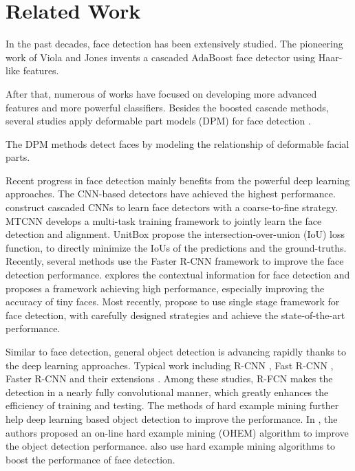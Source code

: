 \documentclass{article} \usepackage{nips13submit_e,times}
\newcommand{\ignore}[1]{}
\begin{document}
\section{Related Work}



In the past decades, face detection has been extensively studied.
The pioneering work of Viola and Jones \cite{vj} 
invents a cascaded AdaBoost face detector using Haar-like features.
\ignore{proposed to learn the cascaded AdaBoost classifier based on Haar-like features for face detection.}
After that, numerous of works \cite{vj1,vj2,vj3} have focused on developing more advanced features and more powerful classifiers. 
Besides the boosted cascade methods, several studies apply deformable
part models (DPM) for face detection \cite{dpmface2,dpmface3,dpmface}. 
\ignore{Besides the cascade based face detection methods, \cite{dpmface2,dpmface3,dpmface} use the deformable
part models (DPM) for face detection.} 
The DPM methods detect faces by modeling the relationship of deformable facial parts.
\ignore{define a face
with a collection of deformable parts and train a classifier to find these parts and their relationship.}

Recent progress in face detection mainly benefits from the powerful 
deep learning approaches. The CNN-based detectors have achieved the highest
performance. \cite{cascadeCNN,cascadeCNN2,spl} construct cascaded CNNs to learn face detectors with a coarse-to-fine
strategy.  MTCNN \cite{spl} develops a multi-task training framework to jointly learn the face detection and alignment.
UnitBox \cite{unitbox} propose the intersection-over-union (IoU) loss function, to directly minimize the
IoUs of the predictions and the ground-truths. Recently, 
several methods \cite{facefrcnn,xm,deepir,cmsrcnn} use the Faster R-CNN framework to improve the face detection performance.
\cite{HR} explores the contextual information for face detection and proposes a framework achieving high performance, especially improving the accuracy of tiny faces. Most recently, \cite{ssh,sfd} propose to use single stage framework for face detection, with carefully designed strategies and achieve the state-of-the-art performance.


Similar to face detection, general object detection is advancing rapidly thanks to the deep learning approaches. 
Typical\ignore{Representative} work including R-CNN \cite{RCNNs}, Fast R-CNN \cite{FastRCNN}, Faster R-CNN \cite{FasterRCNN} and their extensions \cite{RFCN,FPN,maskrcnn}. Among these studies, R-FCN makes the detection in a nearly fully convolutional manner, which greatly enhances the efficiency of training and testing.
The methods of hard example mining further help deep learning based object detection to improve the performance. In \cite{OHEM}, the authors proposed an on-line hard example mining (OHEM) algorithm to improve the object detection performance. \cite{xm,deepir,spl} also use hard example mining algorithms to boost the performance of face detection.
\end{document}
